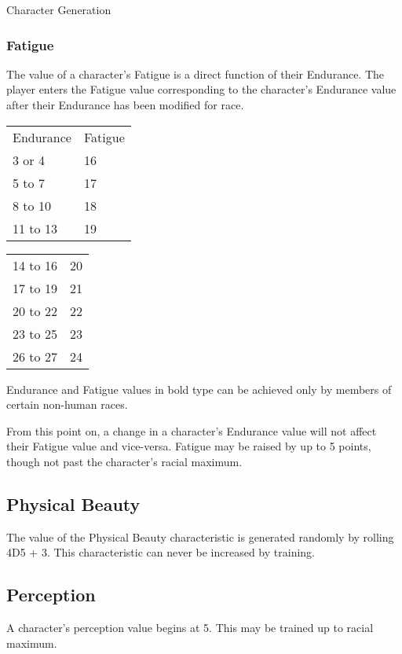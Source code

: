 \begin{Chapter}{Character Generation}
\subsubsection{Fatigue}

The value of a character’s Fatigue is a direct function of their
Endurance.  The player enters the Fatigue value corresponding to the
character’s Endurance value after their Endurance has been modified
for race.

\begin{inline}
\begin{tabular}{m{10em}m{10em}}
Endurance	& Fatigue \\
3 or 4		& 16 \\
5 to 7		& 17 \\
8 to 10		& 18 \\
11 to 13	& 19 \\
\end{tabular}
\par
\begin{tabular}{m{10em}m{10em}}
14 to 16	& 20 \\
17 to 19	& 21 \\
20 to 22	& 22 \\
23 to 25	& 23 \\
26 to 27	& 24 \\
\end{tabular}
\end{inline}


Endurance and Fatigue values in bold type can be achieved only by
members of certain non-human races.

From this point on, a change in a character’s Endurance value will not
affect their Fatigue value and vice-versa.  Fatigue may be raised by
up to 5 points, though not past the character’s racial maximum.

\subsection{Physical Beauty}

The value of the Physical Beauty characteristic is generated randomly
by rolling 4D5 + 3. This characteristic can never be increased by
training.

\subsection{Perception}

A character’s perception value begins at 5.  This may be trained up to
racial maximum.


\end{Chapter}
